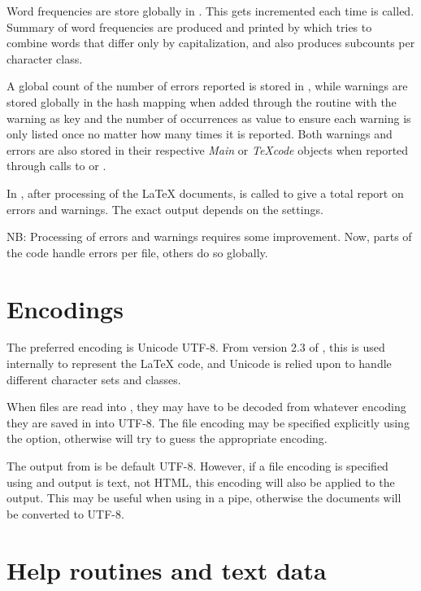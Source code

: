 \documentclass{article}
\newcommand\Obj[1]{\textsl{#1}}
\begin{document}
Word frequencies are store globally in . This gets incremented each time  is called. Summary of word frequencies are produced and printed by  which tries to combine words that differ only by capitalization, and also produces subcounts per character class.

A global count of the number of errors reported is stored in , while warnings are stored globally in the  hash mapping when added through the  routine with the warning as key and the number of occurrences as value to ensure each warning is only listed once no matter how many times it is reported. Both warnings and errors are also stored in their respective \Obj{Main} or \Obj{TeXcode} objects when reported through calls to  or .

In , after processing of the \LaTeX{} documents,  is called to give a total report on errors and warnings. The exact output depends on the settings. 

NB: Processing of errors and warnings requires some improvement. Now, parts of the code handle errors per file, others do so globally.



\section{Encodings}

The preferred encoding is Unicode UTF-8. From version 2.3 of \TeXcount{}, this is used internally to represent the \LaTeX{} code, and Unicode is relied upon to handle different character sets and classes.

When files are read into \TeXcount{}, they may have to be decoded from whatever encoding they are saved in into UTF-8. The file encoding may be specified explicitly using the  option, otherwise \TeXcount{} will try to guess the appropriate encoding.

The output from \TeXcount{} is be default UTF-8. However, if a file encoding is specified using  and output is text, not HTML, this encoding will also be applied to the output. This may be useful when using \TeXcount{} in a pipe, otherwise the documents will be converted to UTF-8.



\section{Help routines and text data}
\end{document}
